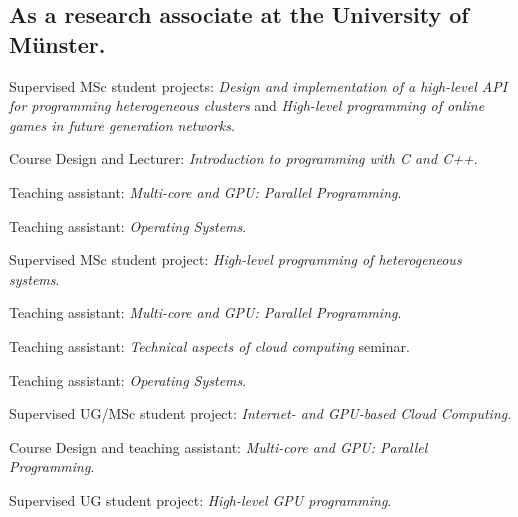 \subsection{\footnotesize As a research associate at the University of M{\"u}nster.}

\begin{cvitemize}[\small 2013 - 2014]
  \item Supervised MSc student projects:
        \emph{Design and implementation of a high-level API for programming heterogeneous clusters} and \emph{High-level programming of online games in future generation networks}.
\end{cvitemize}

\begin{cvitemize}[\small 2012 - 2013]
    \item  Course Design and Lecturer:
        \emph{Introduction to programming with C and C++}.
      \item    Teaching assistant:
        \emph{Multi-core and GPU\@: Parallel Programming}.
    \item Teaching assistant:
        \emph{Operating Systems}.
\end{cvitemize}

\begin{cvitemize}[\small 2011 - 2012]
    \item Supervised MSc student project:
        \emph{High-level programming of heterogeneous systems}.
      \item Teaching assistant:
        \emph{Multi-core and GPU\@: Parallel Programming}.
    \item Teaching assistant:
        \emph{Technical aspects of cloud computing} seminar.
      \item Teaching assistant:
        \emph{Operating Systems}.
\end{cvitemize}

\begin{cvitemize}[\small 2010 - 2011]
    \item Supervised UG/MSc student project:
        \emph{Internet- and GPU-based Cloud Computing}.
      \item Course Design and teaching assistant:
        \emph{Multi-core and GPU\@: Parallel Programming}.
    \item Supervised UG student project:
        \emph{High-level GPU programming}.
\end{cvitemize}